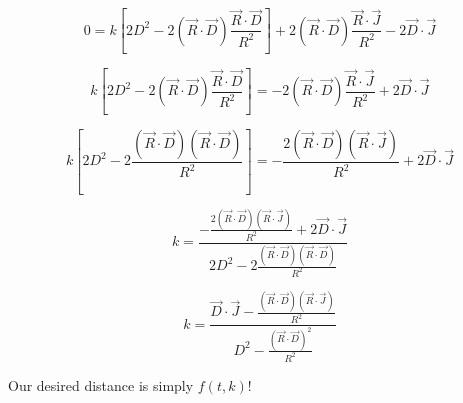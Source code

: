 \documentclass[12pt]{article}
\begin{document}
\[ 0 = k \left[ 2D^2 -2 (\vec{R} \cdot \vec{D}) \frac{\vec{R}\cdot\vec{D}}{R^2} \right] + 2(\vec{R} \cdot \vec{D})\frac{\vec{R}\cdot\vec{J}}{R^2} - 2\vec{D} \cdot \vec{J} \]

\[ k \left[ 2D^2 -2 (\vec{R} \cdot \vec{D}) \frac{\vec{R}\cdot\vec{D}}{R^2} \right] = -2(\vec{R} \cdot \vec{D})\frac{\vec{R}\cdot\vec{J}}{R^2} + 2\vec{D} \cdot \vec{J} \]

\[ k \left[ 2D^2 -2\frac{(\vec{R} \cdot \vec{D})(\vec{R}\cdot\vec{D})}{R^2} \right] = -\frac{2(\vec{R} \cdot \vec{D})(\vec{R}\cdot\vec{J})}{R^2} + 2\vec{D} \cdot \vec{J} \]

\[ k = \frac{ -\frac{2(\vec{R} \cdot \vec{D})(\vec{R}\cdot\vec{J})}{R^2} + 2\vec{D} \cdot \vec{J} } { 2D^2 -2\frac{(\vec{R} \cdot \vec{D})(\vec{R}\cdot\vec{D})}{R^2} } \]

\[ k = \frac{ \vec{D} \cdot \vec{J} - \frac{(\vec{R} \cdot \vec{D})(\vec{R}\cdot\vec{J})}{R^2} } { D^2 -\frac{(\vec{R} \cdot \vec{D})^2}{R^2} } \]

Our desired distance is simply $f(t, k)$!
\end{document}
